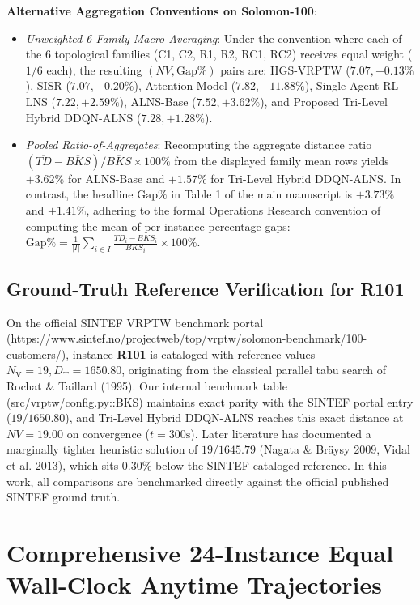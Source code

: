 \documentclass{article}
\newcommand{\NV}{{N_\mathrm{V}}}
\newcommand{\TD}{{D_\mathrm{T}}}
\begin{document}
\noindent\textbf{Alternative Aggregation Conventions on Solomon-100}:
\begin{itemize}
    \item \textit{Unweighted 6-Family Macro-Averaging}: Under the convention where each of the 6 topological families (C1, C2, R1, R2, RC1, RC2) receives equal weight ($1/6$ each), the resulting $(NV, \text{Gap\%})$ pairs are: HGS-VRPTW ($7.07, +0.13\%$), SISR ($7.07, +0.20\%$), Attention Model ($7.82, +11.88\%$), Single-Agent RL-LNS ($7.22, +2.59\%$), ALNS-Base ($7.52, +3.62\%$), and Proposed Tri-Level Hybrid DDQN-ALNS ($7.28, +1.28\%$).
    \item \textit{Pooled Ratio-of-Aggregates}: Recomputing the aggregate distance ratio $(\overline{TD} - \overline{BKS}) / \overline{BKS} \times 100\%$ from the displayed family mean rows yields $+3.62\%$ for ALNS-Base and $+1.57\%$ for Tri-Level Hybrid DDQN-ALNS. In contrast, the headline $\text{Gap\%}$ in Table 1 of the main manuscript is $+3.73\%$ and $+1.41\%$, adhering to the formal Operations Research convention of computing the mean of per-instance percentage gaps: $\text{Gap\%} = \frac{1}{|I|}\sum_{i \in I} \frac{TD_i - BKS_i}{BKS_i} \times 100\%$.
\end{itemize}

\subsection{Ground-Truth Reference Verification for R101}
On the official SINTEF VRPTW benchmark portal (\textsf{https://www.sintef.no/projectweb/top/vrptw/solomon-benchmark/100-customers/}), instance \textbf{R101} is cataloged with reference values $\NV=19, \TD=1650.80$, originating from the classical parallel tabu search of Rochat \& Taillard (1995). Our internal benchmark table (\textsf{src/vrptw/config.py::BKS}) maintains exact parity with the SINTEF portal entry ($19/1650.80$), and Tri-Level Hybrid DDQN-ALNS reaches this exact distance at $NV=19.00$ on convergence ($t=300\text{s}$). Later literature has documented a marginally tighter heuristic solution of $19/1645.79$ (Nagata \& Bräysy 2009, Vidal et al. 2013), which sits $0.30\%$ below the SINTEF cataloged reference. In this work, all comparisons are benchmarked directly against the official published SINTEF ground truth.

\section{Comprehensive 24-Instance Equal Wall-Clock Anytime Trajectories}
\label{sec:supp_anytime_trajectories}
\end{document}
